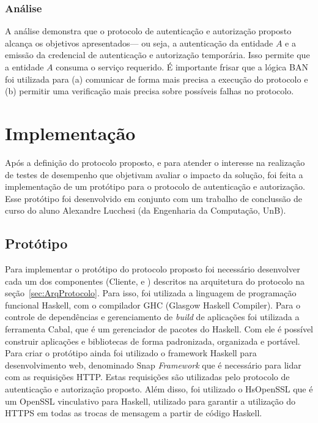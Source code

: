 \subsubsection{Análise}

A análise demonstra que o protocolo de autenticação e autorização proposto alcança os objetivos apresentados--- ou seja, a autenticação da entidade ${A}$ e a emissão da credencial de autenticação e autorização temporária. Isso permite que a entidade ${A}$ consuma o serviço requerido. É importante frisar que a lógica BAN foi utilizada para (a) comunicar de forma mais precisa a execução do protocolo e (b) permitir uma verificação mais precisa sobre possíveis falhas no protocolo. %


\section{Implementação}\label{sec:implementacao}

Após a definição do protocolo proposto, e para atender o interesse na realização de testes de desempenho que objetivam avaliar o impacto da solução, foi feita a implementação de um protótipo para o protocolo de autenticação e autorização. Esse protótipo foi desenvolvido em conjunto com um trabalho de conclussão de curso do aluno Alexandre Lucchesi (da Engenharia da Computação, UnB).

\subsection{Protótipo}

Para implementar o protótipo do protocolo proposto foi necessário desenvolver cada um dos componentes (Cliente, \servidorAA e \servidorRest) descritos na arquitetura do protocolo na seção~\ref{sec:ArqProtocolo}. Para isso, foi utilizada a linguagem de programação funcional Haskell, com o compilador GHC (Glasgow Haskell Compiler).
Para o controle de dependências e gerenciamento de \emph{build} de aplicações foi utilizada a ferramenta Cabal, que é um gerenciador de pacotes do Haskell. Com ele é possível construir aplicações e bibliotecas de forma padronizada, organizada e portável. Para criar o protótipo ainda foi utilizado o framework Haskell para desenvolvimento web, denominado Snap \emph{Framework} que é necessário para lidar com as requisições HTTP. Estas requisições são utilizadas pelo protocolo de autenticação e autorização proposto. Além disso, foi utilizado o HsOpenSSL que é um OpenSSL vinculativo para Haskell, utilizado para garantir a utilização do HTTPS em todas as trocas de mensagem a partir de código Haskell.

